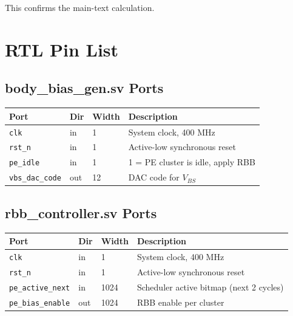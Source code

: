 This confirms the main-text calculation.

\section{RTL Pin List}
\label{app:rtl-pinlist}

\subsection{body\_bias\_gen.sv Ports}

\begin{center}
\begin{tabular}{llll}
\hline
\textbf{Port} & \textbf{Dir} & \textbf{Width} & \textbf{Description} \\
\hline
\texttt{clk}         & in  & 1  & System clock, 400 MHz \\
\texttt{rst\_n}      & in  & 1  & Active-low synchronous reset \\
\texttt{pe\_idle}    & in  & 1  & 1 = PE cluster is idle, apply RBB \\
\texttt{vbs\_dac\_code} & out & 12 & DAC code for $V_{BS}$ \\
\hline
\end{tabular}
\end{center}

\subsection{rbb\_controller.sv Ports}

\begin{center}
\begin{tabular}{llll}
\hline
\textbf{Port} & \textbf{Dir} & \textbf{Width} & \textbf{Description} \\
\hline
\texttt{clk}             & in  & 1    & System clock, 400 MHz \\
\texttt{rst\_n}          & in  & 1    & Active-low synchronous reset \\
\texttt{pe\_active\_next}& in  & 1024 & Scheduler active bitmap (next 2 cycles) \\
\texttt{pe\_bias\_enable}& out & 1024 & RBB enable per cluster \\
\hline
\end{tabular}
\end{center}

